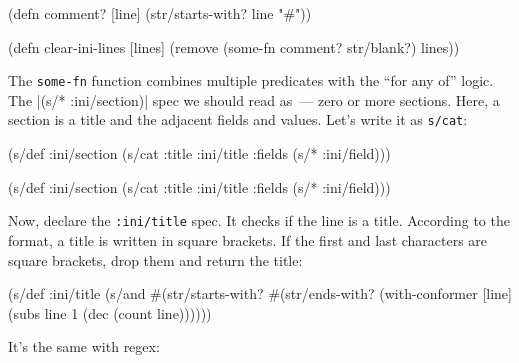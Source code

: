 \else

\begin{english}
  \begin{clojure}
(defn comment? [line]
  (str/starts-with? line "#"))

(defn clear-ini-lines [lines]
  (remove (some-fn comment? str/blank?) lines))
  \end{clojure}
\end{english}

\fi


The \verb|some-fn| function combines multiple predicates with the ``for any of'' logic. The \spverb|(s/* :ini/section)| spec we should read as~--- zero or more sections. Here, a section is a title and the adjacent fields and values. Let's write it as \verb|s/cat|:

\ifx\DEVICETYPE\MOBILE

\begin{english}
  \begin{clojure}
(s/def :ini/section
  (s/cat :title
    :ini/title :fields (s/* :ini/field)))
  \end{clojure}
\end{english}

\else

\begin{english}
  \begin{clojure}
(s/def :ini/section
  (s/cat :title :ini/title :fields (s/* :ini/field)))
  \end{clojure}
\end{english}

\fi

Now, declare the \verb|:ini/title| spec. It checks if the line is a title. According to the format, a title is written in square brackets. If the first and last characters are square brackets, drop them and return the title:

\begin{english}
  \begin{clojure}
(s/def :ini/title
  (s/and
   #(str/starts-with? %
   #(str/ends-with? %
   (with-conformer [line]
     (subs line 1 (dec (count line))))))
  \end{clojure}
\end{english}

\noindent
It's the same with regex:

\ifx\DEVICETYPE\MOBILE

\begin{english}
\end{english}

